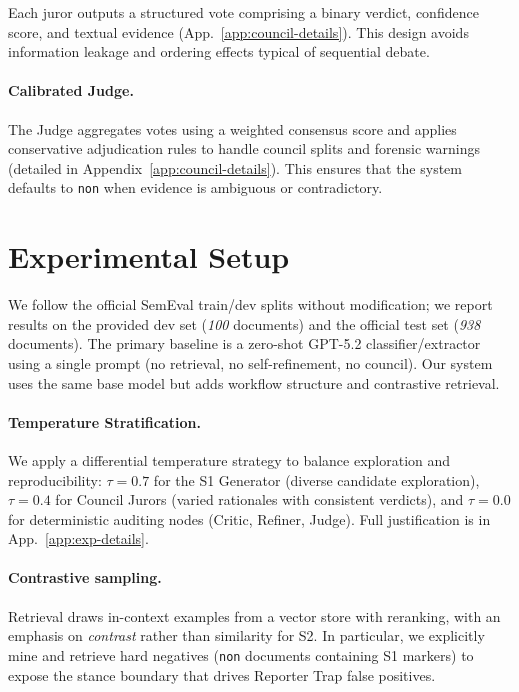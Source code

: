 \documentclass[11pt]{article}
\begin{document}
Each juror outputs a structured vote comprising a binary verdict, confidence
score, and textual evidence (App.~\ref{app:council-details}). This design avoids information leakage and ordering
effects typical of sequential debate.


\paragraph{Calibrated Judge.} The Judge aggregates votes using a weighted consensus score and applies
conservative adjudication rules to handle council splits and forensic warnings
(detailed in Appendix~\ref{app:council-details}). This ensures that the system
defaults to \texttt{non} when evidence is ambiguous or contradictory.

\section{Experimental Setup}

We follow the official SemEval train/dev splits without modification; we report
results on the provided dev set (\textit{100} documents) and the official test
set (\textit{938} documents). The primary baseline is a zero-shot GPT-5.2
classifier/extractor using a single prompt (no retrieval, no self-refinement,
no council). Our system uses the same base model but adds workflow structure
and contrastive retrieval.

\paragraph{Temperature Stratification.} We apply a differential temperature strategy to balance exploration and reproducibility: $\tau=0.7$ for the S1 Generator (diverse candidate exploration), $\tau=0.4$ for Council Jurors (varied rationales with consistent verdicts), and $\tau=0.0$ for deterministic auditing nodes (Critic, Refiner, Judge). Full justification is in App.~\ref{app:exp-details}.

\paragraph{Contrastive sampling.} Retrieval draws in-context examples from a vector store with reranking, with an
emphasis on \emph{contrast} rather than similarity for S2. In particular, we
explicitly mine and retrieve hard negatives (\texttt{non} documents containing
S1 markers) to expose the stance boundary that drives Reporter Trap false
positives.
\end{document}
